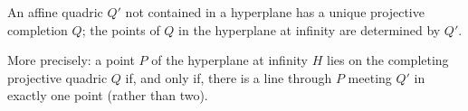 An affine quadric $Q'$ not contained in a hyperplane has a unique projective completion $Q$; the points of $Q$ in the hyperplane at infinity are determined by $Q'$.

More precisely: a point $P$ of the hyperplane at infinity $H$ lies on the completing projective quadric $Q$ if, and only if, there is a line through $P$ meeting $Q'$ in exactly one point (rather than two).
